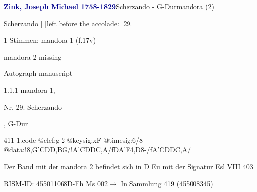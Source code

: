 \documentclass[twocolumn]{book}
\begin{document}
\par \vspace{7pt} \textcolor{darkblue}{\textbf{Zink, Joseph Michael  1758-1829}}\hfillplus{\textbf{[411]}}\newline Scherzando - G-Dur\newline mandora (2)
\par \begin{itshape}[f.17v, at left:] Scherzando | [left before the accolade:] 29.\end{itshape} 
\par \textcolor{darkblue}{}  1 Stimmen: mandora 1  (f.17v)\newline \begin{small} mandora 2 missing\end{small} \newline Autograph manuscript
\par 1.1.1  mandora 1, \begin{itshape}Nr. 29. Scherzando\end{itshape}, G-Dur  
\begin{filecontents*}{411-1.code}
@clef:g-2
@keysig:xF
@timesig:6/8
@data:!8,G'CD{D,B}G/!A'CDDC,A/fDA'F4,D8-/fA'CDDC,A/
\end{filecontents*}
\newline
%
\par Der Band mit der mandora 2 befindet sich in D Eu mit der Signatur Esl VIII 403
\par RISM-ID: 455011068\newline D-Fh  Ms 002\newline $\rightarrow$ In Sammlung 419 (455008345)
      
\end{document}
